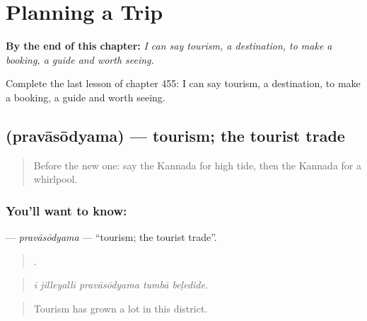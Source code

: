 
\chapter{Planning a Trip}
\label{ch:ka-planning-a-trip}

\begin{chapteropening}
\textbf{By the end of this chapter:} \emph{I can say tourism, a destination, to make a booking, a guide and worth seeing.}

Complete the last lesson of chapter 455: I can say tourism, a destination, to make a booking, a guide and worth seeing.
\end{chapteropening}

\section[\texorpdfstring{\kn{ಪ್ರವಾಸೋದ್ಯಮ} (pravāsōdyama)}{ಪ್ರವಾಸೋದ್ಯಮ (pravāsōdyama)}]{ (pravāsōdyama) — tourism; the tourist trade}

\label{lesson:KA-C455-pravasodyama}



\begin{quote}
Before the new one: say the Kannada for high tide, then the Kannada for a whirlpool.
\end{quote}

\subsection*{You'll want to know: }
\textbf{} — \emph{pravāsōdyama} — \textquotedblleft{}tourism; the tourist trade\textquotedblright{}.

\begin{quote}
    .
\end{quote}

\begin{quote}
\emph{ī jilleyalli pravāsōdyama tumbā beḷedide.}
\end{quote}

\begin{quote}
Tourism has grown a lot in this district.
\end{quote}

